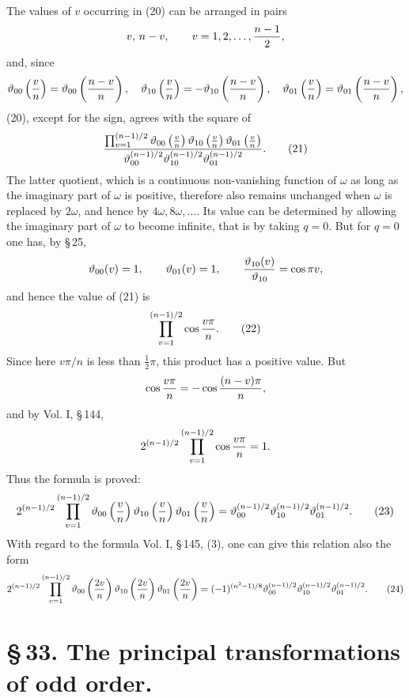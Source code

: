 \documentclass[11pt]{article}
\providecommand{\tht}{\vartheta}
\begin{document}
The values of $v$ occurring in (20) can be arranged in pairs
\[
v,\,n-v,
\qquad v=1,2,\ldots,{n-1\over2},
\]
and, since
\[
\tht_{00}\left({v\over n}\right)=\tht_{00}\left({n-v\over n}\right),\quad
\tht_{10}\left({v\over n}\right)=-\tht_{10}\left({n-v\over n}\right),\quad
\tht_{01}\left({v\over n}\right)=\tht_{01}\left({n-v\over n}\right),
\]
(20), except for the sign, agrees with the square of
\begin{equation}
{\prod_{v=1}^{(n-1)/2}\tht_{00}\left({v\over n}\right)\tht_{10}\left({v\over n}\right)\tht_{01}\left({v\over n}\right)
\over
\tht_{00}^{(n-1)/2}\tht_{10}^{(n-1)/2}\tht_{01}^{(n-1)/2}}. \tag{21}
\end{equation}
The latter quotient, which is a continuous non-vanishing function of $\omega$ as long as the imaginary part of $\omega$ is positive, therefore also remains unchanged when $\omega$ is replaced by $2\omega$, and hence by $4\omega,8\omega,
\ldots$. Its value can be determined by allowing the imaginary part of $\omega$ to become infinite, that is by taking $q=0$. But for $q=0$ one has, by \S\,25,
\[
\tht_{00}(v)=1,
\qquad
\tht_{01}(v)=1,
\qquad
{\tht_{10}(v)\over\tht_{10}}=\cos \pi v,
\]
and hence the value of (21) is
\begin{equation}
\prod_{v=1}^{(n-1)/2}\cos{v\pi\over n}. \tag{22}
\end{equation}
Since here $v\pi/n$ is less than $\frac12\pi$, this product has a positive value. But
\[
\cos {v\pi\over n}=-\cos{(n-v)\pi\over n},
\]
and by Vol. I, \S\,144,
\[
2^{(n-1)/2}\prod_{v=1}^{(n-1)/2}\cos{v\pi\over n}=1.
\]
Thus the formula is proved:
\begin{equation}
2^{(n-1)/2}\prod_{v=1}^{(n-1)/2}
\tht_{00}\left({v\over n}\right)\tht_{10}\left({v\over n}\right)\tht_{01}\left({v\over n}\right)
=\tht_{00}^{(n-1)/2}\tht_{10}^{(n-1)/2}\tht_{01}^{(n-1)/2}. \tag{23}
\end{equation}
With regard to the formula Vol. I, \S\,145, (3), one can give this relation also the form
\begin{equation}
2^{(n-1)/2}\prod_{v=1}^{(n-1)/2}
\tht_{00}\left({2v\over n}\right)\tht_{10}\left({2v\over n}\right)\tht_{01}\left({2v\over n}\right)
=(-1)^{(n^2-1)/8}\tht_{00}^{(n-1)/2}\tht_{10}^{(n-1)/2}\tht_{01}^{(n-1)/2}. \tag{24}
\end{equation}

\section*{\S\,33. The principal transformations of odd order.}
\end{document}
